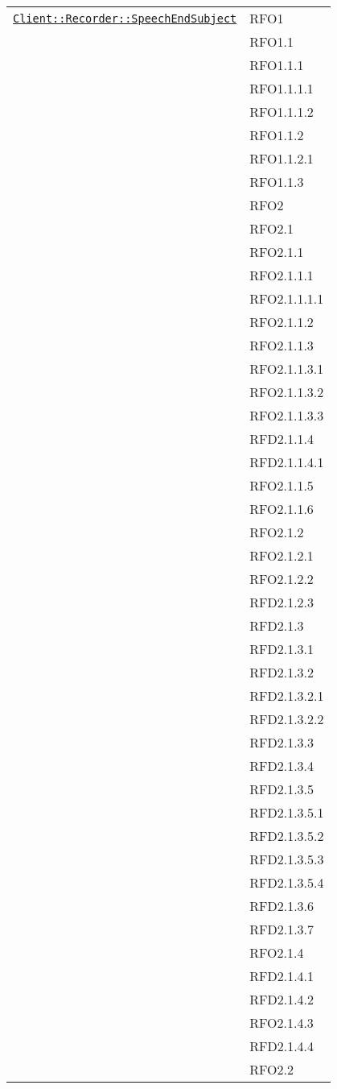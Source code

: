 \begin{longtable}{|>{\centering}m{10cm}|m{3cm}<{\centering}|}
\hyperref[Client::Recorder::SpeechEndSubject]{\texttt{Client::Recorder::SpeechEndSubject}} & RFO1\\
& RFO1.1\\
& RFO1.1.1\\
& RFO1.1.1.1\\
& RFO1.1.1.2\\
& RFO1.1.2\\
& RFO1.1.2.1\\
& RFO1.1.3\\
& RFO2\\
& RFO2.1\\
& RFO2.1.1\\
& RFO2.1.1.1\\
& RFO2.1.1.1.1\\
& RFO2.1.1.2\\
& RFO2.1.1.3\\
& RFO2.1.1.3.1\\
& RFO2.1.1.3.2\\
& RFO2.1.1.3.3\\
& RFD2.1.1.4\\
& RFD2.1.1.4.1\\
& RFO2.1.1.5\\
& RFO2.1.1.6\\
& RFO2.1.2\\
& RFO2.1.2.1\\
& RFO2.1.2.2\\
& RFD2.1.2.3\\
& RFD2.1.3\\
& RFD2.1.3.1\\
& RFD2.1.3.2\\
& RFD2.1.3.2.1\\
& RFD2.1.3.2.2\\
& RFD2.1.3.3\\
& RFD2.1.3.4\\
& RFD2.1.3.5\\
& RFD2.1.3.5.1\\
& RFD2.1.3.5.2\\
& RFD2.1.3.5.3\\
& RFD2.1.3.5.4\\
& RFD2.1.3.6\\
& RFD2.1.3.7\\
& RFO2.1.4\\
& RFD2.1.4.1\\
& RFD2.1.4.2\\
& RFO2.1.4.3\\
& RFD2.1.4.4\\
& RFO2.2\\

\end{longtable}

